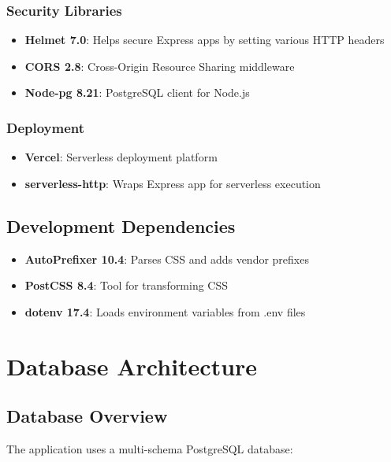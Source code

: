 \documentclass[12pt,a4paper]{report}
\begin{document}
\subsection{Security Libraries}

\begin{itemize}
    \item \textbf{Helmet 7.0}: Helps secure Express apps by setting various HTTP headers
    \item \textbf{CORS 2.8}: Cross-Origin Resource Sharing middleware
    \item \textbf{Node-pg 8.21}: PostgreSQL client for Node.js
\end{itemize}

\subsection{Deployment}
\begin{itemize}
    \item \textbf{Vercel}: Serverless deployment platform
    \item \textbf{serverless-http}: Wraps Express app for serverless execution
\end{itemize}

\section{Development Dependencies}

\begin{itemize}
    \item \textbf{AutoPrefixer 10.4}: Parses CSS and adds vendor prefixes
    \item \textbf{PostCSS 8.4}: Tool for transforming CSS
    \item \textbf{dotenv 17.4}: Loads environment variables from .env files
\end{itemize}

\newpage

\chapter{Database Architecture}

\section{Database Overview}

The application uses a multi-schema PostgreSQL database:
\end{document}
